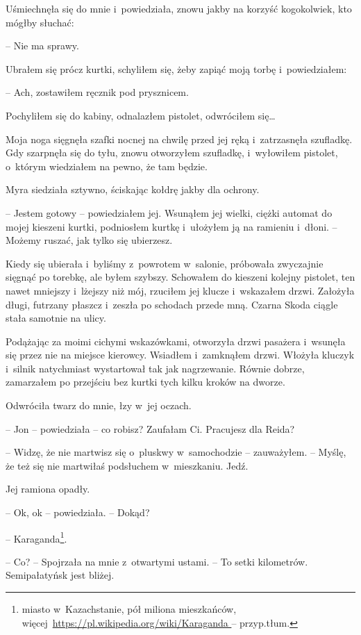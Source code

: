 \documentclass[oneside,polish,11pt,sfheadings]{mwbk}
\begin{document}
Uśmiechnęła się do mnie i~powiedziała, znowu jakby na korzyść
kogokolwiek, kto mógłby słuchać: 

-- Nie ma sprawy.

Ubrałem się prócz kurtki, schyliłem się, żeby zapiąć moją torbę i~powiedziałem: 


-- Ach, zostawiłem ręcznik pod prysznicem.

Pochyliłem się do kabiny, odnalazłem pistolet, odwróciłem się\ldots

Moja noga sięgnęła szafki nocnej na chwilę przed jej ręką i~zatrzasnęła
szufladkę. Gdy szarpnęła się do tyłu, znowu otworzyłem szufladkę, i~wyłowiłem pistolet, o~którym wiedziałem na pewno, że tam będzie.

Myra siedziała sztywno, ściskając kołdrę jakby dla ochrony.

-- Jestem gotowy -- powiedziałem jej. Wsunąłem jej wielki, ciężki automat
do mojej kieszeni kurtki, podniosłem kurtkę i~ułożyłem ją na ramieniu i~dłoni. -- Możemy ruszać, jak tylko się ubierzesz.

Kiedy się ubierała i~byliśmy z~powrotem w~salonie, próbowała zwyczajnie
sięgnąć po torebkę, ale byłem szybszy. Schowałem do kieszeni kolejny
pistolet, ten nawet mniejszy i~lżejszy niż mój, rzuciłem jej klucze i~wskazałem drzwi. Założyła długi, futrzany płaszcz i~zeszła po schodach
przede mną. Czarna Skoda ciągle stała samotnie na ulicy.

Podążając za moimi cichymi wskazówkami, otworzyła drzwi pasażera i~wsunęła się przez nie na miejsce kierowcy. Wsiadłem i~zamknąłem drzwi.
Włożyła kluczyk i~silnik natychmiast wystartował tak jak nagrzewanie.
Równie dobrze, zamarzałem po przejściu bez kurtki tych kilku kroków na
dworze.

Odwróciła twarz do mnie, łzy w~jej oczach.

-- Jon -- powiedziała -- co robisz? Zaufałam Ci. Pracujesz dla Reida?

-- Widzę, że nie martwisz się o~pluskwy w~samochodzie -- zauważyłem. -- Myślę, że też się nie martwiłaś podsłuchem w~mieszkaniu. Jedź.

Jej ramiona opadły. 


-- Ok, ok -- powiedziała. -- Dokąd?

-- Karaganda\footnote{miasto w~Kazachstanie, pół miliona mieszkańców,
więcej~\url{https://pl.wikipedia.org/wiki/Karaganda } -- przyp.tłum.}.
 
-- Co? -- Spojrzała na mnie z~otwartymi ustami. -- To setki kilometrów.
Semipałatyńsk jest bliżej.
\end{document}
